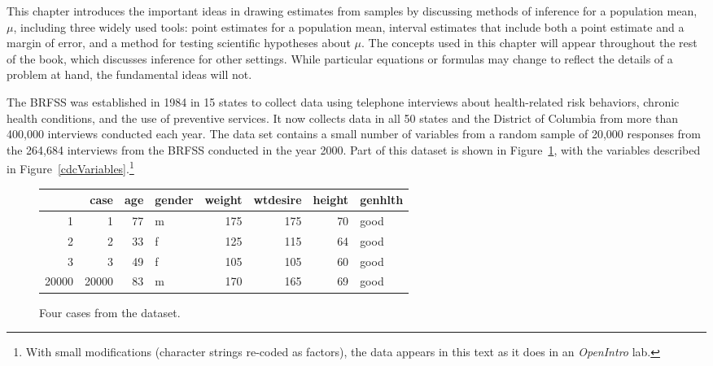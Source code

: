 {This chapter introduces the important ideas in drawing estimates from samples by discussing methods of inference for a population mean, $\mu$, including three widely used tools: point estimates for a population mean, interval estimates that include both a point estimate and a margin of error, and a method for testing scientific hypotheses about $\mu$. The concepts used in this chapter will appear throughout the rest of the book, which discusses inference for other settings. While particular equations or formulas may change to reflect the details of a problem at hand, the fundamental ideas will not.

\textD{\newpage}


The BRFSS was established in 1984 in 15 states to collect data using telephone interviews about health-related risk behaviors, chronic health conditions, and the use of preventive services.  It now collects data in all 50 states and the District of Columbia from more than 400,000 interviews conducted each year.  The data set  contains a small number of variables from a random sample of 20,000 responses from the 264,684 interviews from the BRFSS conducted in the year 2000.  Part of this dataset is shown in Figure~\ref{cdcDF}, with the variables described in Figure~\ref{cdcVariables}.\footnote{With small modifications (character strings re-coded as factors), the data appears in this text as it does in an \textit{OpenIntro} lab. }

\begin{figure}[ht]
\centering
\begin{tabular}{rrrlrrrl}
  \hline
 & case & age & gender & weight & wtdesire & height & genhlth \\ 
  \hline
1 &   1 &  77 & m & 175 & 175 &  70 & good \\ 
  2 &   2 &  33 & f & 125 & 115 &  64 & good \\ 
  3 &   3 &  49 & f & 105 & 105 &  60 & good \\ 
  20000 & 20000 &  83 & m & 170 & 165 &  69 & good \\ 
   \hline
\end{tabular}
\caption{Four cases from the  dataset.}
\label{cdcDF}
\end{figure}

}
